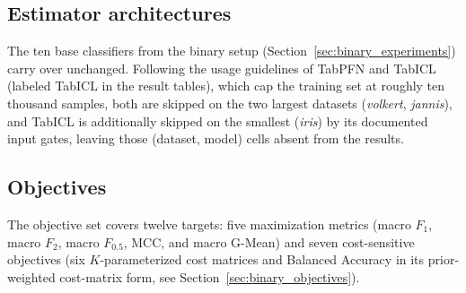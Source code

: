 

\subsection{Estimator architectures}
The ten base classifiers from the binary setup (Section~\ref{sec:binary_experiments}) carry over unchanged. Following the usage guidelines of TabPFN \citep{hollmann2025accurate} and TabICL \citep{qu2025tabicl} (labeled TabICL in the result tables), which cap the training set at roughly ten thousand samples, both are skipped on the two largest datasets (\textit{volkert}, \textit{jannis}), and TabICL is additionally skipped on the smallest (\textit{iris}) by its documented input gates, leaving those (dataset, model) cells absent from the results.

\subsection{Objectives}\label{sec:multiclass_objectives}
The objective set covers twelve targets: five maximization metrics (macro $F_1$, macro $F_2$, macro $F_{0.5}$, MCC, and macro G-Mean) and seven cost-sensitive objectives (six $K$-parameterized cost matrices and Balanced Accuracy in its prior-weighted cost-matrix form, see Section~\ref{sec:binary_objectives}).

